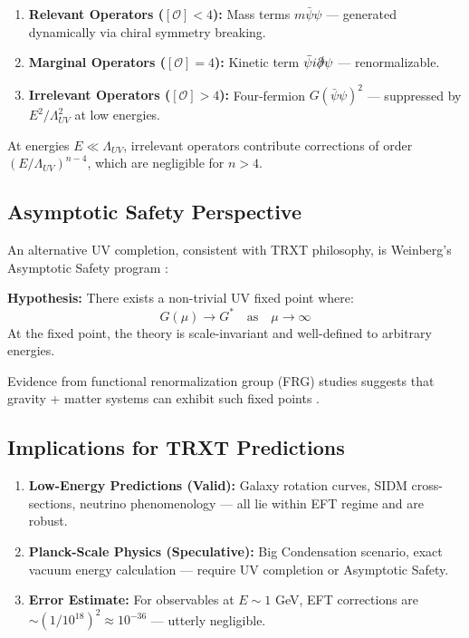 \documentclass[a4paper,12pt]{article}
\begin{document}
\begin{enumerate}
    \item \textbf{Relevant Operators ($[\mathcal{O}] < 4$):} Mass terms $m\bar{\psi}\psi$ — generated dynamically via chiral symmetry breaking.
    \item \textbf{Marginal Operators ($[\mathcal{O}] = 4$):} Kinetic term $\bar{\psi} i \slashed{\partial} \psi$ — renormalizable.
    \item \textbf{Irrelevant Operators ($[\mathcal{O}] > 4$):} Four-fermion $G(\bar{\psi}\psi)^2$ — suppressed by $E^2/\Lambda_{UV}^2$ at low energies.
\end{enumerate}

At energies $E \ll \Lambda_{UV}$, irrelevant operators contribute corrections of order $(E/\Lambda_{UV})^{n-4}$, which are negligible for $n > 4$.

\subsection{Asymptotic Safety Perspective}

An alternative UV completion, consistent with TRXT philosophy, is Weinberg's Asymptotic Safety program \cite{weinberg_as}:

\textbf{Hypothesis:} There exists a non-trivial UV fixed point where:
\begin{equation}
    G(\mu) \to G^* \quad \text{as} \quad \mu \to \infty
\end{equation}
At the fixed point, the theory is scale-invariant and well-defined to arbitrary energies.

Evidence from functional renormalization group (FRG) studies suggests that gravity + matter systems can exhibit such fixed points \cite{reuter}.

\subsection{Implications for TRXT Predictions}

\begin{enumerate}
    \item \textbf{Low-Energy Predictions (Valid):} Galaxy rotation curves, SIDM cross-sections, neutrino phenomenology — all lie within EFT regime and are robust.
    \item \textbf{Planck-Scale Physics (Speculative):} Big Condensation scenario, exact vacuum energy calculation — require UV completion or Asymptotic Safety.
    \item \textbf{Error Estimate:} For observables at $E \sim 1$ GeV, EFT corrections are $\sim (1/10^{18})^2 \approx 10^{-36}$ — utterly negligible.
\end{enumerate}
\end{document}
